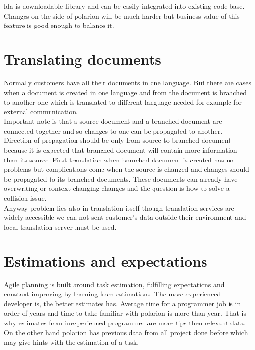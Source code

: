 \documentclass[thesis=M,english]{FITthesis}[2012/06/26]
\begin{document}
\acrshort{lda} is downloadable library and can be easily integrated into existing code base. Changes on the side of \acrshort{polarion} will be much harder but business value of this feature is good enough to balance it.

\section{Translating documents}

Normally customers have all their documents in one language. But there are cases when a document is created in one language and from the document is branched to another one which is translated to different language needed for example for external communication.\\

Important note is that a source document and a branched document are connected together and so changes to one can be propagated to another. Direction of propagation should be only from source to branched document because it is expected that branched document will contain more information than its source. First translation when branched document is created has no problems but complications come when the source is changed and changes should be propagated to its branched documents. These documents can already have overwriting or context changing changes and the question is how to solve a collision issue. \\

Anyway problem lies also in translation itself though translation services are widely accessible we can not sent customer's data outside their environment and local translation server must be used.

\section{Estimations and expectations}

Agile planning is built around task estimation, fulfilling expectations and constant improving by learning from estimations. The more experienced developer is, the better estimates has. Average time for a programmer job is in order of years and time to take familiar with \acrshort{polarion} is more than year. That is why estimates from inexperienced programmer are more tips then relevant data. On the other hand \acrshort{polarion} has previous data from all project done before which may give hints with the estimation of a task.\\ 
\end{document}

